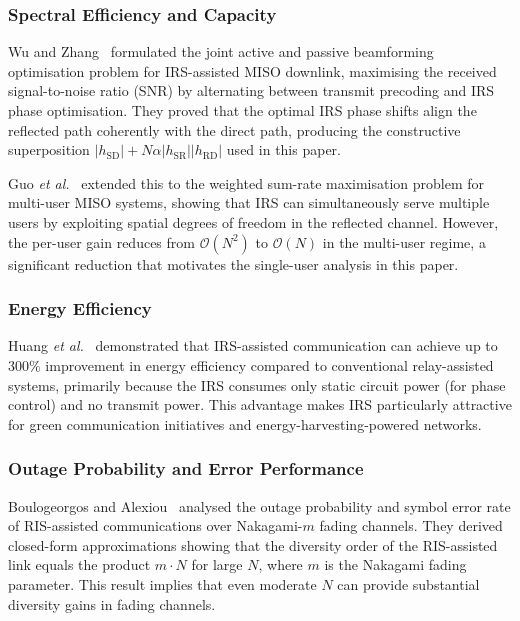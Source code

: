 \documentclass[journal]{IEEEtran} %
\begin{document}
\subsubsection{Spectral Efficiency and Capacity}

Wu and Zhang~\cite{wu2019irs_beamforming} formulated the joint active and passive beamforming optimisation problem for IRS-assisted MISO downlink, maximising the received signal-to-noise ratio (SNR) by alternating between transmit precoding and IRS phase optimisation. They proved that the optimal IRS phase shifts align the reflected path coherently with the direct path, producing the constructive superposition $|h_{\mathrm{SD}}| + N\alpha|h_{\mathrm{SR}}||h_{\mathrm{RD}}|$ used in this paper.

Guo \textit{et al.}~\cite{guo2020irs_weighted} extended this to the weighted sum-rate maximisation problem for multi-user MISO systems, showing that IRS can simultaneously serve multiple users by exploiting spatial degrees of freedom in the reflected channel. However, the per-user gain reduces from $\mathcal{O}(N^2)$ to $\mathcal{O}(N)$ in the multi-user regime, a significant reduction that motivates the single-user analysis in this paper.

\subsubsection{Energy Efficiency}

Huang \textit{et al.}~\cite{huang2019irs_ee} demonstrated that IRS-assisted communication can achieve up to 300\% improvement in energy efficiency compared to conventional relay-assisted systems, primarily because the IRS consumes only static circuit power (for phase control) and no transmit power. This advantage makes IRS particularly attractive for green communication initiatives and energy-harvesting-powered networks.

\subsubsection{Outage Probability and Error Performance}

Boulogeorgos and Alexiou~\cite{boulogeorgos2020ris_error} analysed the outage probability and symbol error rate of RIS-assisted communications over Nakagami-$m$ fading channels. They derived closed-form approximations showing that the diversity order of the RIS-assisted link equals the product $m \cdot N$ for large $N$, where $m$ is the Nakagami fading parameter. This result implies that even moderate $N$ can provide substantial diversity gains in fading channels.
\end{document}
